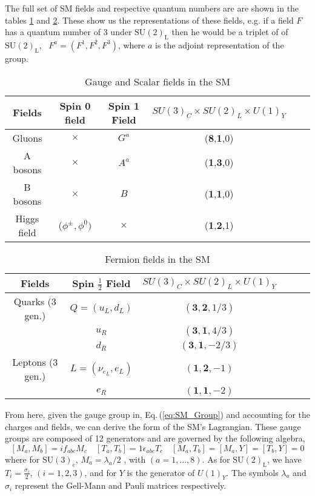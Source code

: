 The full set of SM fields and respective quantum numbers are are shown in the tables \ref{table1} and \ref{table2}. These show us the representations of these fields, e.g. if a field $F$ has a quantum number of 3 under $\mathrm{SU(2)_L}$ then he would be a triplet of of $\mathrm{SU(2)_L}$, \ $F^a = (F^1,F^2,F^3)$, where $a$ is the adjoint representation of the group.   
%
\begin{table}[H]
\centering
\caption{Gauge and Scalar fields in the SM}
\label{table1}
\begin{tabular}{@{}cccccc@{}}
  \hline	
 Fields & Spin 0 field & Spin 1 Field & $SU(3)_C \times SU(2)_L \times U(1)_Y$  \\
  \hline	
 Gluons  & $\times$  & $G^a$ & (\textbf{8},\textbf{1},0) \\	
A bosons & $\times$  & $A^a$ & (\textbf{1},\textbf{3},0)   \\
B bosons & $\times$  & $B$   & (\textbf{1},\textbf{1},0)   \\
Higgs field & ($\phi^\pm, \phi^0 )$  & $\times$ & (\textbf{1},\textbf{2},1) \\ \hline
\end{tabular}
\end{table}
%
\begin{table}[H]
\centering
\caption{Fermion fields in the SM}
\label{table2}
\begin{tabular}{@{}cccccc@{}}
  \hline	
 Fields & Spin $\frac{1}{2}$ Field & $SU(3)_C \times SU(2)_L \times U(1)_Y$  \\
  \hline	
Quarks (3 gen.) & $Q=(u_L,d_L)$ & $(\mathbf{3},\mathbf{2},{1}/{3})$ \\	
$\quad$        & $u_R$ & $(\mathbf{3},\mathbf{1},{4}/{3})$   \\
$\quad$   & $d_R$ & $(\mathbf{3},\mathbf{1}, -{2}/{3})$   \\
Leptons (3 gen.) & $L=(\nu_{e_L}, e_L )$ & $(\mathbf{1},\mathbf{2},-1)$  \\
$\quad$   & $e_R$ & $(\mathbf{1},\mathbf{1},-2)   $ \\ \hline
%
\end{tabular}
\end{table}
%
From here, given the gauge group in, Eq.\,(\ref{eq:SM_Group}) and accounting for the charges and fields, we can derive the form of the SM's Lagrangian. These gauge groups are composed of 12 generators and are governed by the following algebra, 
% 
\begin{equation}
\left[ M_a , M_b \right] = i f_{abc} M_c \quad \left[ T_a , T_b \right] = 1 \epsilon_{abc} T_c \quad \left[ M_a , T_b \right] = \left[ M_a , Y \right] = \left[ T_b,Y \right] = 0 
\end{equation}
%
where for $\mathrm{SU(3)_c}$, $M_a = {\lambda_a}/{2}$ , with $(a = 1, . . . , 8)$. As for $\mathrm{SU(2)_L}$, we have $T_i= \frac{\sigma_i}{2} $, $(i = 1, 2, 3)$, and for $Y$ is the generator of $U(1)_Y$. The symbols $\lambda_a$ and $\sigma_i$ represent the Gell-Mann and Pauli matrices respectively. 

